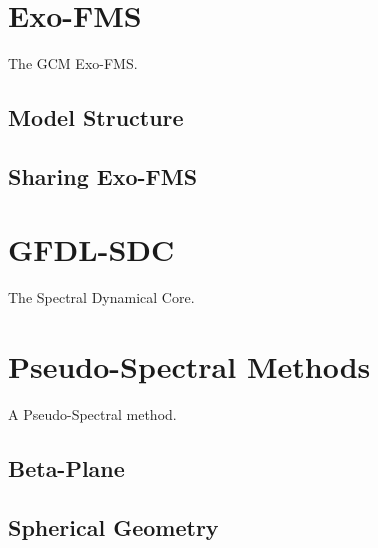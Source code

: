 \newpage
\appendix

\chapter{Exo-FMS}\label{ap:exo-fms}

The GCM Exo-FMS.

\section{Model Structure}

\section{Sharing Exo-FMS}

\chapter{GFDL-SDC}\label{ap:gfdl-sdc}

The Spectral Dynamical Core.


\chapter{Pseudo-Spectral Methods}\label{ap:ps-methods}

A Pseudo-Spectral method.

\section{Beta-Plane}

\section{Spherical Geometry}
